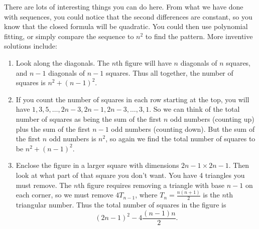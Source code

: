 \documentclass[12pt]{exam}
\begin{document}
\begin{questions}
	\begin{solution}
	  There are lots of interesting things you can do here.  From what we have done with sequences, you could notice that the second differences are constant, so you know that the closed formula will be quadratic.  You could then use polynomial fitting, or simply compare the sequence to $n^2$ to find the pattern.  More inventive solutions include:
	  \begin{enumerate}
	    \item Look along the diagonals.  The $n$th figure will have $n$ diagonals of $n$ squares, and $n-1$ diagonals of $n-1$ squares.  Thus all together, the number of squares is $n^2 + (n-1)^2$.
	    \item If you count the number of squares in each row starting at the top, you will have $1, 3, 5, \ldots, 2n-3, 2n-1, 2n-3, \ldots, 3, 1$.  So we can think of the total number of squares as being the sum of the first $n$ odd numbers (counting up) plus the sum of the first $n-1$ odd numbers (counting down).  But the sum of the first $n$ odd numbers is $n^2$, so again we find the total number of squares to be $n^2 + (n-1)^2$.
	    \item Enclose the figure in a larger square with dimensions $2n-1 \times 2n-1$.  Then look at what part of that square you don't want.  You have 4 triangles you must remove.  The $n$th figure requires removing a triangle with base $n-1$ on each corner, so we must remove $4T_{n-1}$, where $T_n = \frac{n(n+1)}{2}$ is the $n$th triangular number.  Thus the total number of squares in the figure is
	    \[(2n-1)^2 - 4\frac{(n-1)n}{2}.\]
	  \end{enumerate}
	\end{solution}

\end{questions}
\end{document}
